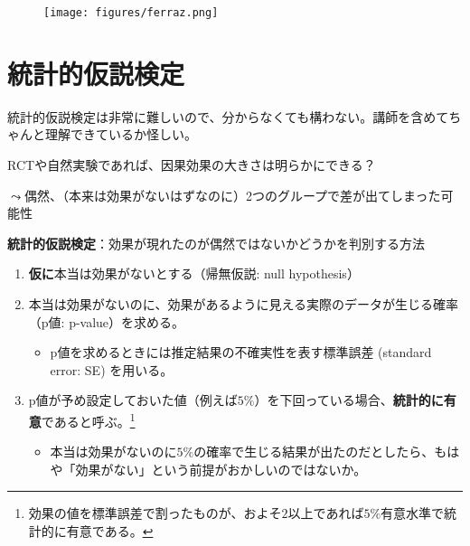 \documentclass[
  xelatex,
  ja=standard]{bxjsarticle}
\providecommand{\tightlist}{%
  \setlength{\itemsep}{0pt}\setlength{\parskip}{0pt}}\usepackage{longtable,booktabs,array}
\begin{document}
\begin{figure}[htpb]

{\centering \texttt{[image: figures/ferraz.png]}

}

\caption{\citet{ferraz2008}}

\end{figure}

\hypertarget{ux7d71ux8a08ux7684ux4eeeux8aacux691cux5b9a}{%
\section{統計的仮説検定}\label{ux7d71ux8a08ux7684ux4eeeux8aacux691cux5b9a}}

\begin{tcolorbox}[enhanced jigsaw, leftrule=.75mm, colframe=quarto-callout-warning-color-frame, titlerule=0mm, title=\textcolor{quarto-callout-warning-color}{\faExclamationTriangle}\hspace{0.5em}{警告}, colbacktitle=quarto-callout-warning-color!10!white, opacityback=0, breakable, rightrule=.15mm, coltitle=black, opacitybacktitle=0.6, bottomtitle=1mm, toptitle=1mm, arc=.35mm, bottomrule=.15mm, colback=white, left=2mm, toprule=.15mm]

統計的仮説検定は非常に難しいので、分からなくても構わない。講師を含めてちゃんと理解できているか怪しい。

\end{tcolorbox}

RCTや自然実験であれば、因果効果の大きさは明らかにできる？

\(\leadsto\)偶然、（本来は効果がないはずなのに）2つのグループで差が出てしまった可能性

\textbf{統計的仮説検定}：効果が現れたのが偶然ではないかどうかを判別する方法

\begin{enumerate}
\def\labelenumi{\arabic{enumi}.}
\tightlist
\item
  \textbf{仮に}本当は効果がないとする（帰無仮説: null hypothesis）
\item
  本当は効果がないのに、効果があるように見える実際のデータが生じる確率（p値:
  p-value）を求める。

  \begin{itemize}
  \tightlist
  \item
    p値を求めるときには推定結果の不確実性を表す標準誤差 (standard error:
    SE) を用いる。
  \end{itemize}
\item
  p値が予め設定しておいた値（例えば\(5\%\)）を下回っている場合、\textbf{統計的に有意}であると呼ぶ。\footnote{効果の値を標準誤差で割ったものが、およそ\(2\)以上であれば\(5\%\)有意水準で統計的に有意である。}

  \begin{itemize}
  \tightlist
  \item
    本当は効果がないのに\(5\%\)の確率で生じる結果が出たのだとしたら、もはや「効果がない」という前提がおかしいのではないか。
  \end{itemize}
\end{enumerate}
\end{document}
